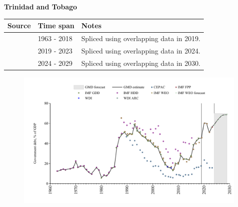 \documentclass[12pt,a4paper,landscape]{article}
\begin{document}
\begin{adjustbox}{max totalsize={\paperwidth}{\paperheight},center}
\begin{minipage}[t][\textheight][t]{\textwidth}
\vspace*{0.5cm}
{}
\begin{center}
{\Large\bfseries Trinidad and Tobago}
\end{center}
\vspace{0.5cm}
\begin{table}[H]
\centering
\small
\begin{tabular}{|l|l|l|}
\hline
\textbf{Source} & \textbf{Time span} & \textbf{Notes} \\
\hline
\rowcolor{white}\cite{IMF_GDD}& 1963 - 2018 &Spliced using overlapping data in 2019.\\
\rowcolor{lightgray}\cite{IMF_FPP}& 2019 - 2023 &Spliced using overlapping data in 2024.\\
\rowcolor{white}\cite{IMF_WEO_forecast}& 2024 - 2029 &Spliced using overlapping data in 2030.\\
\hline
\end{tabular}
\end{table}
\begin{figure}[H]
\centering
\includegraphics[width=\textwidth,height=0.6\textheight,keepaspectratio]{graphs/TTO_govdebt_GDP.pdf}
\end{figure}
\end{minipage}
\end{adjustbox}
\end{document}
